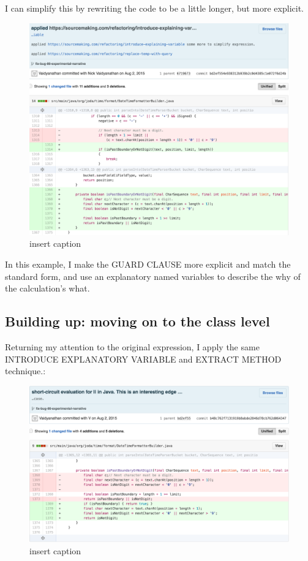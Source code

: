 I can simplify this by rewriting the code to be a little longer, but more explicit. 

\begin{figure}[H]
	\centering
	\includegraphics[width=\linewidth]{code2}
	\caption{insert caption}
\end{figure}

In this example, I make the GUARD CLAUSE more explicit and match the standard form, and use an explanatory named variables to describe the why of the calculation’s what.

\subsection{Building up: moving on to the class level}

Returning my attention to the original expression, I apply the same INTRODUCE EXPLANATORY VARIABLE and EXTRACT METHOD technique.:

\begin{figure}[H]
	\centering
	\includegraphics[width=\linewidth]{code3}
	\caption{insert caption}
\end{figure}

